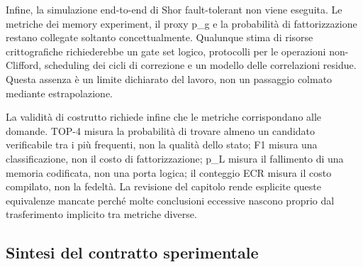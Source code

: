 Infine, la simulazione end-to-end di Shor fault-tolerant non viene eseguita. Le metriche dei memory experiment, il proxy p\_g e la probabilità di fattorizzazione restano collegate soltanto concettualmente. Qualunque stima di risorse crittografiche richiederebbe un gate set logico, protocolli per le operazioni non-Clifford, scheduling dei cicli di correzione e un modello delle correlazioni residue. Questa assenza è un limite dichiarato del lavoro, non un passaggio colmato mediante estrapolazione.

La validità di costrutto richiede infine che le metriche corrispondano alle domande. TOP-4 misura la probabilità di trovare almeno un candidato verificabile tra i più frequenti, non la qualità dello stato; F1 misura una classificazione, non il costo di fattorizzazione; p\_L misura il fallimento di una memoria codificata, non una porta logica; il conteggio ECR misura il costo compilato, non la fedeltà. La revisione del capitolo rende esplicite queste equivalenze mancate perché molte conclusioni eccessive nascono proprio dal trasferimento implicito tra metriche diverse.

\subsection{Sintesi del contratto sperimentale}\label{sec:finale_3_5_8}

